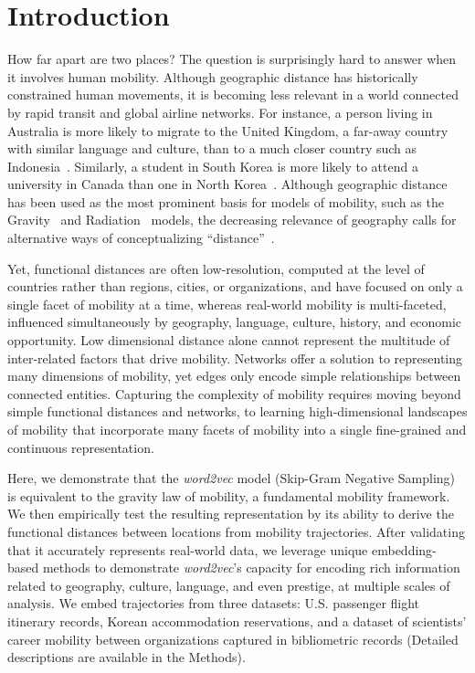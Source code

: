 \documentclass[12pt]{article} %
\begin{document}
%
%
\section*{Introduction}\label{sec:introduction} %


How far apart are two places?
The question is surprisingly hard to answer when it involves human mobility.
Although geographic distance has historically constrained human movements, it is becoming less relevant in a world connected by rapid transit and global airline networks.
For instance, a person living in Australia is more likely to migrate to the United Kingdom, a far-away country with similar language and culture, than to a much closer country such as Indonesia~\autocite{pew2018migration}.
Similarly, a student in South Korea is more likely to attend a university in Canada than one in North Korea~\autocite{unesco2019students}.
Although geographic distance has been used as the most prominent basis for models of mobility, such as the Gravity~\autocite{zipf1946gravity} and Radiation~\autocite{simini2012universal} models, the decreasing relevance of geography calls for alternative ways of conceptualizing ``distance''~\autocite{boschma2005proximity, brown1970migration, kim2018functional}.

Yet, functional distances are often low-resolution, computed at the level of countries rather than regions, cities, or organizations, and have focused on only a single facet of mobility at a time, whereas real-world mobility is multi-faceted, influenced simultaneously by geography, language, culture, history, and economic opportunity.
Low dimensional distance alone cannot represent the multitude of inter-related factors that drive mobility.
Networks offer a solution to representing many dimensions of mobility, yet edges only encode simple relationships between connected entities.
Capturing the complexity of mobility requires moving beyond simple functional distances and networks, to learning high-dimensional landscapes of mobility that incorporate many facets of mobility into a single fine-grained and continuous representation.

Here, we demonstrate that the \textit{word2vec} model (Skip-Gram Negative Sampling) is equivalent to the gravity law of mobility, a fundamental mobility framework.
We then empirically test the resulting representation by its ability to derive the functional distances between locations from mobility trajectories.
After validating that it accurately represents real-world data, we leverage unique embedding-based methods to demonstrate \textit{word2vec}'s capacity for encoding rich information related to geography, culture, language, and even prestige, at multiple scales of analysis.
We embed trajectories from three datasets: U.S. passenger flight itinerary records, Korean accommodation reservations, and a dataset of scientists' career mobility between organizations captured in bibliometric records (Detailed descriptions are available in the Methods).
\end{document}

